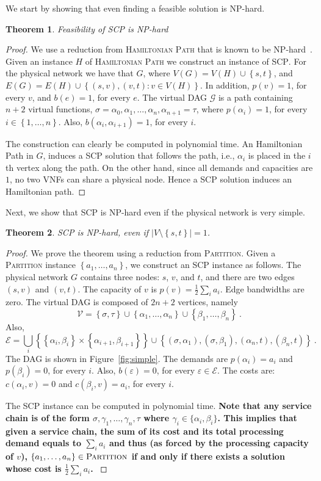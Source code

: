 \documentclass[11pt]{article}
\newcommand{\fix}[1]{{\color{purple}\textbf{#1}}}
\newtheorem{theorem}{Theorem}
\newcommand{\set}[1]{\left\{ #1 \right\}}
\newcommand{\abs}[1]{\left| #1 \right|}
\newcommand{\half}{\frac{1}{2}}
\newcommand{\eps}{\varepsilon}
\newcommand{\scp}{\textsc{SCP}\xspace}
\newcommand{\calE}{\mathcal{E}}
\newcommand{\calG}{\mathcal{G}}
\newcommand{\calV}{\mathcal{V}}
\begin{document}
We start by showing that even finding a feasible solution is NP-hard.

\begin{theorem}
Feasibility of \scp is NP-hard
\end{theorem}
\begin{proof}
We use a reduction from \textsc{Hamiltonian Path} that is known to be
NP-hard~\cite{GarJoh79}.
%
Given an instance $H$ of \textsc{Hamiltonian Path} we construct an
instance of \scp.  For the physical network we have that $G$, where
$V(G) = V(H) \cup \set{s,t}$, and $E(G) = E(H) \cup \set{(s,v),(v,t) :
  v \in V(H)}$.  In addition, $p(v) = 1$, for every $v$, and $b(e) =
1$, for every $e$.  The virtual DAG $\calG$ is a path containing $n+2$
virtual functions, $\sigma = \alpha_0, \alpha_1, \ldots, \alpha_n,
\alpha_{n+1} = \tau$, where $p(\alpha_i) = 1$, for every $i \in
\set{1,\ldots,n}$.  Also, $b(\alpha_i,\alpha_{i+1}) = 1$, for every
$i$.

The construction can clearly be computed in polynomial time.
%
An Hamiltonian Path in $G$, induces a \scp solution that follows the
path, i.e., $\alpha_i$ is placed in the $i$th vertex along the path.
%
On the other hand, since all demands and capacities are $1$, no two
VNFs can share a physical node.  Hence a \scp solution induces an
Hamiltonian path.
\end{proof}

Next, we show that \scp is NP-hard even if the physical network is
very simple. 

\begin{theorem}
\label{thm:simple}
\scp is NP-hard, even if $\abs{V \setminus \set{s,t}} = 1$.
\end{theorem}
\begin{proof}
We prove the theorem using a reduction from \textsc{Partition}.
Given a \textsc{Partition} instance $\set{a_1, \ldots, a_n}$, we
construct an \scp instance as follows.
%
The physical network $G$ contains three nodes: $s$, $v$, and $t$, and
there are two edges $(s,v)$ and $(v,t)$.  The capacity of $v$ is $p(v)
= \half \sum_i a_i$.  Edge bandwidths are zero.
%
The virtual DAG is composed of $2n+2$ vertices, namely
\[
\calV
= \set{\sigma,\tau}
  \cup \set{\alpha_1, \ldots, \alpha_n}
  \cup \set{\beta_1, \ldots, \beta_n}
~.
\]
Also,
\[
\calE
= \bigcup_i \set{ \set{\alpha_i,\beta_i} \times \set{\alpha_{i+1},\beta_{i+1}} } 
  \cup
  \set{ (\sigma,\alpha_1), (\sigma,\beta_1), (\alpha_n,t), (\beta_n,t) }
~.
\]
The DAG is shown in Figure~\ref{fig:simple}.
%
The demands are $p(\alpha_i) = a_i$ and $p(\beta_i) = 0$, for every
$i$.  Also, $b(\eps) = 0$, for every $\eps \in \calE$.  The costs are:
$c(\alpha_i,v) = 0$ and $c(\beta_i,v) = a_i$, for every $i$.

The \scp instance can be computed in polynomial time.
%
\fix{
Note that any service chain is of the form $\sigma, \gamma_1, \dots, \gamma_n, \tau$ where $\gamma_i \in \{\alpha_i, \beta_i\}$. 
This implies that given a service chain, the sum of its cost and its total processing demand equals to $\sum_i a_i$ and thus (as forced by the processing capacity of $v$), $\set{a_1, \ldots, a_n} \in \textsc{Partition}$ if and only if there exists a solution whose cost is $\half \sum_i a_i$.
}
\end{proof}
\end{document}
